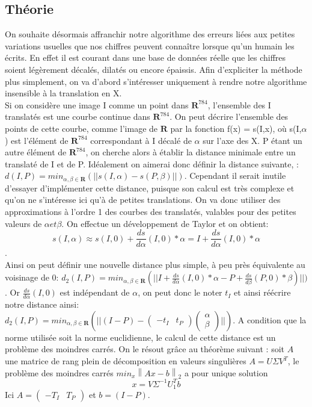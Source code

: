 \documentclass[a4paper,11pt,twoside]{report}
\newcommand{\norm}[1]{\left\lVert#1\right\rVert} %
\begin{document}
\subsection{Théorie}
On souhaite désormais affranchir notre algorithme des erreurs liées aux petites variations usuelles que nos chiffres peuvent connaître lorsque qu'un humain les écrits. En effet il est courant dans une base de données réelle que les chiffres soient légèrement décalés, dilatés ou encore épaissis. Afin d'expliciter la méthode plus simplement, on va d'abord s’intéresser uniquement à rendre notre algorithme insensible à la translation en X. \\
Si on considère une image I comme un point dans $\textbf{R}^{784}$, l'ensemble des I translatés est une courbe continue dans $\textbf{R}^{784}$. On peut décrire l'ensemble des points de cette courbe, comme l'image de $\textbf{R}$ par la fonction f(x) = s(I,x), où s(I,$\alpha$) est l'élément de  $\textbf{R}^{784}$ correspondant à I décalé de $\alpha$ sur l'axe des X. P étant un autre élément de $\textbf{R}^{784}$, on cherche alors à établir la distance minimale entre un translaté de I et de P. Idéalement on aimerai donc définir la distance suivante, : $d(I,P)= min_{\alpha,\beta \in \textbf{R}} (||s(I,\alpha)-s(P,\beta)||)$. Cependant il serait inutile d'essayer d'implémenter cette distance, puisque son calcul est très complexe et qu'on ne s’intéresse ici qu'à de petites translations. On va donc utiliser des approximations à l'ordre 1 des courbes des translatés, valables pour des petites valeurs de $\alpha et \beta$. On effectue un développement de Taylor et on obtient:$$s(I,\alpha)\approx s(I,0) + \frac{ds}{d\alpha}(I,0)*\alpha=I + \frac{ds}{d\alpha}(I,0)*\alpha$$.\\
Ainsi on peut définir une nouvelle distance plus simple, à peu près équivalente au voisinage de 0: $d_{2}(I,P)= min_{\alpha,\beta \in \textbf{R}} (||I+\frac{ds}{d\alpha}(I,0)*\alpha-P+\frac{ds}{d\beta}(P,0)*\beta)||)$. Or $\frac{ds}{d\alpha}(I,0)$ est indépendant de $\alpha$, on peut donc le noter $t_{I}$ et ainsi réécrire notre distance ainsi: $d_{2}(I,P)= min_{\alpha,\beta \in \textbf{R}} (||(I-P)-\begin{pmatrix}-t_{I} & t_{P}\end{pmatrix} \begin{pmatrix}\alpha \\ \beta\end{pmatrix} ||)$. 
 A condition que la norme utilisée soit la norme euclidienne, le calcul de cette distance est un problème des moindres carrés. On le résout grâce au théorème suivant : soit $A$ une matrice de rang plein de décomposition en valeurs singulières $A = U\Sigma V^T$, le problème des moindres carrés $min_x\norm{Ax-b}_2$ a pour unique solution $$x = V\Sigma^{-1}U_1^Tb$$ Ici $A = \begin{pmatrix}-T_{I} & T_{P}\end{pmatrix}$ et $b = (I-P)$.\\
\end{document}
